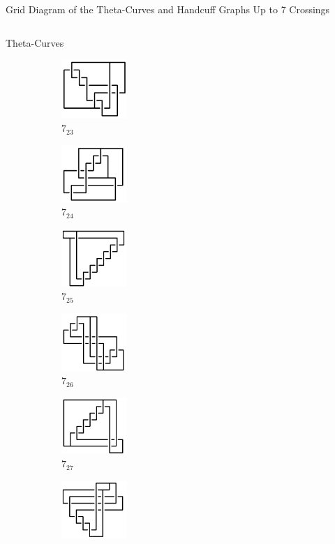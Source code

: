 \documentclass[final]{beamer}
\begin{document}
\begin{frame}[t]
\begin{alertblock}{Grid Diagram of the Theta-Curves and Handcuff Graphs Up to 7 Crossings}
\begin{columns}[t]
\begin{column}{0.7\textwidth}
\begin{alertblock}{Theta-Curves}
\begin{figure}
\begin{subfigure}{0.075\textwidth}
    \includegraphics[width=2.5cm]{../Midterm_Poster/grid_diagram/theta_7_23.png}
    \caption{$7_{23}$} 
    \end{subfigure}
    \begin{subfigure}{0.075\textwidth}
    \includegraphics[width=2.5cm]{../Midterm_Poster/grid_diagram/theta_7_24.png}
    \caption{$7_{24}$} 
    \end{subfigure}
    \begin{subfigure}{0.075\textwidth}
    \includegraphics[width=2.5cm]{../Midterm_Poster/grid_diagram/theta_7_25.png}
    \caption{$7_{25}$} 
    \end{subfigure}
    \begin{subfigure}{0.075\textwidth}
    \includegraphics[width=2.5cm]{../Midterm_Poster/grid_diagram/theta_7_26.png}
    \caption{$7_{26}$} 
    \end{subfigure}
    \begin{subfigure}{0.075\textwidth}
    \includegraphics[width=2.5cm]{../Midterm_Poster/grid_diagram/theta_7_27.png}
    \caption{$7_{27}$} 
    \end{subfigure}
    \begin{subfigure}{0.075\textwidth}
    \includegraphics[width=2.5cm]{../Midterm_Poster/grid_diagram/theta_7_28.png}

\end{subfigure}
\end{figure}
\end{alertblock}
\end{column}
\end{columns}
\end{alertblock}
\end{frame}
\end{document}
